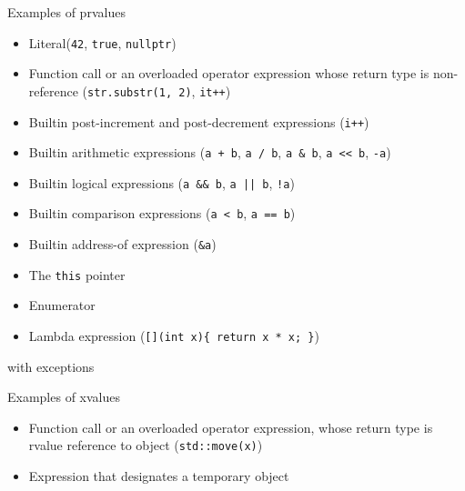 \begin{frame}{Examples of prvalues}{}
  \begin{examples}
    \begin{itemize}
    \item
      Literal\manualfootnote (\lstinline!42!, \lstinline!true!, \lstinline!nullptr!)
    \item
      Function call or an overloaded operator expression whose return type is non-reference (\lstinline!str.substr(1, 2)!, \lstinline!it++!)
    \item
      Builtin post-increment and post-decrement expressions (\lstinline!i++!)
    \item
      Builtin arithmetic expressions (\lstinline!a + b!, \lstinline!a / b!, \lstinline!a & b!, \lstinline!a << b!, \lstinline!-a!)
    \item
      Builtin logical expressions (\lstinline!a && b!, \lstinline!a || b!, \lstinline|!a|)
    \item
      Builtin comparison expressions (\lstinline!a < b!, \lstinline!a == b!)
    \item
      Builtin address-of expression (\lstinline!&a!)
    \item
      The \lstinline!this! pointer
    \item
      Enumerator
    \item
      Lambda expression (\lstinline![](int x){ return x * x; }!)
    \end{itemize}

    \raggedleft
    \footnotesize
    \manualfootnote with exceptions
  \end{examples}
\end{frame}

\begin{frame}{Examples of xvalues}{}
  \begin{examples}
    \begin{itemize}
    \item
      Function call or an overloaded operator expression, whose return type is rvalue reference to object (\lstinline!std::move(x)!)
    \item
      Expression that designates a temporary object
    \end{itemize}
  \end{examples}
\end{frame}

